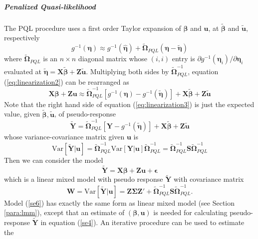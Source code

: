 \subparagraph*{Penalized Quasi-likelihood}
The PQL procedure uses a first order Taylor expansion of $\bm \beta$ and $\bm u$, at $\tilde{\bm
	\beta} $ and $ \tilde{\bm u} $, respectively
\begin{equation}\label{eq:linearization2}
	g^{-1}(\bm\eta) \approx g^{-1}(\hat{\bm \eta}) + \tilde{\bm \Omega}_{PQL}(\bm \eta-\tilde{\bm
		\eta})
\end{equation} 
where $\tilde{\bm \Omega}_{PQL}$ is an $n\times n$ diagonal matrix whose $(i, i)$ entry is 
$\partial {g^{-1}(\bm \eta_i)}/\partial \bm \eta_i $ evaluated at $\tilde{\bm \eta}= \bm X\tilde{\bm
	\beta} + \bm Z\tilde{\bm u}$. Multiplying both sides by $\bm \tilde{\bm\Omega}_{PQL}^{-1}$,
equation
(\ref{eq:linearization2}) can be rearranged as 
\begin{equation}\label{eq:linearization3}
	\bm {X\beta} + \bm {Zu} \approx \tilde{\bm \Omega}_{PQL}^{-1}[g^{-1}(\bm\eta)- g^{-1}(\tilde{\bm
		\eta})]  + \bm{X}\tilde{\bm \beta} + \bm Z\tilde{\bm u}
\end{equation}
Note that the right hand side of equation (\ref{eq:linearization3}) is just the expected value,
given $\tilde{\bm \beta}, \tilde{\bm u}$, of	 pseudo-response 
\begin{equation}\label{se4}
	\tilde{\bm Y }=\tilde{\bm \Omega}_{PQL}^{-1}[\bm Y- g^{-1}(\tilde{\bm \eta})]  + \bm{X}\tilde{\bm
		\beta} + \bm Z\tilde{\bm u}
\end{equation}
whose variance-covariance matrix given $\bm u$ is 
\begin{equation}\label{se5}
	\text{Var}[\tilde{\bm Y }|\bm u] =\tilde{\bm \Omega}_{PQL}^{-1} \text{Var}[\bm Y|\bm u]\tilde{\bm
		\Omega}_{PQL}^{-1} = 
	\tilde{\bm \Omega}_{PQL}^{-1} \bm S \tilde{\bm \Omega}_{PQL}^{-1}
\end{equation}
Then we can consider the model 
\begin{equation}\label{se6}
	\tilde{\bm Y } = \bm{X\beta} + \bm {Zu}  + \bm \epsilon
\end{equation}
which is a linear mixed model with pseudo response $\tilde{\bm Y }$ with covariance matrix 
\begin{equation}
	\bm W = \text{Var}[ \tilde{\bm Y } |\bm u] = \bm{Z\Sigma Z'} + \tilde{\bm \Omega}_{PQL}^{-1} \bm S
	\tilde{\bm \Omega}_{PQL}^{-1}.
\end{equation}
Model (\ref{se6})  has exactly the same form as linear mixed model (see Section \ref{para:lmm}),
except that an estimate of $(\bm\beta, \bm u)$  is needed for calculating pseudo-response
$\tilde{\bm Y }$ in equation (\ref{se4}). An iterative procedure can be used to estimate the
